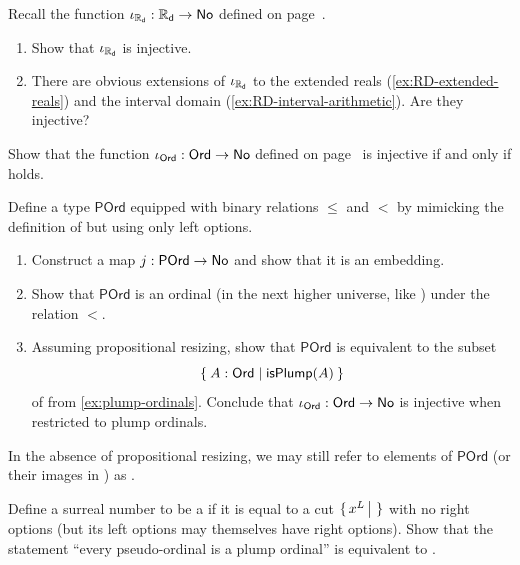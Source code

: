 \begin{ex}\label{ex:reals-into-surreals}
  Recall the function $\iota_{\mathbb{R}_\mathsf{d}}:\mathbb{R}_\mathsf{d}\to\mathsf{No}$ defined on page~\pageref{reals-into-surreals}.
  \begin{enumerate}
  \item Show that $\iota_{\mathbb{R}_\mathsf{d}}$ is injective.
  \item There are obvious extensions of $\iota_{\mathbb{R}_\mathsf{d}}$ to the extended reals (\cref{ex:RD-extended-reals}) and the interval domain (\cref{ex:RD-interval-arithmetic}).
    Are they injective?
  \end{enumerate}
\end{ex}

\begin{ex}\label{ex:ord-into-surreals}
  Show that the function $\iota_{\mathsf{Ord}}:\mathsf{Ord}\to\mathsf{No}$ defined on page~\pageref{ord-into-surreals} is injective if and only if \LEM{} holds.
\end{ex}

\begin{ex}\label{ex:hiit-plump}
  Define a type $\mathsf{POrd}$ equipped with binary relations $\le$ and $<$ by mimicking the definition of \NO but using only left options.
  \begin{enumerate}
  \item Construct a map $j:\mathsf{POrd} \to \mathsf{No}$ and show that it is an embedding.
  \item Show that $\mathsf{POrd}$ is an ordinal (in the next higher universe, like \ord) under the relation $<$.
  \item Assuming propositional resizing, show that $\mathsf{POrd}$ is equivalent to the subset
    \[\setof{A:\ord | \mathsf{isPlump}(A)}\]
    of \ord from \cref{ex:plump-ordinals}.
    Conclude that $\iota_{\mathsf{Ord}}:\mathsf{Ord}\to\mathsf{No}$ is injective when restricted to plump ordinals.
  \end{enumerate}
  In the absence of propositional resizing, we may still refer to elements of $\mathsf{POrd}$ (or their images in \NO) as .
\end{ex}

\begin{ex}\label{ex:pseudo-ordinals}
  Define a surreal number to be a  if it is equal to a cut $\{\,x^L\,\big|\,\,\}$ with no right options (but its left options may themselves have right options).
  Show that the statement ``every pseudo-ordinal is a plump ordinal'' is equivalent to \LEM{}.
\end{ex}

